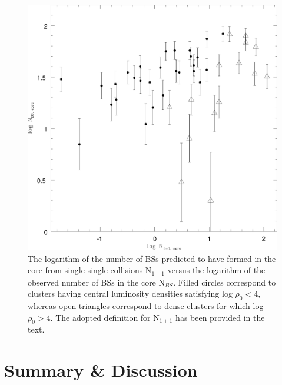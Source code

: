 \begin{figure} [!h]
  \begin{center}
 \includegraphics[scale=0.5]{Chapter-4/fig5.eps}
\caption[Plot showing the logarithm of the number of BSs predicted to
have formed in the core from single-single collisions versus the logarithm of
the observed number of BSs in the core.]{The logarithm of the number
  of BSs predicted to have formed in the core from single-single collisions
  N$_{1+1}$ 
  versus the logarithm of the observed number of BSs in the core N$_{BS}$.
  Filled circles correspond to clusters
having central luminosity densities satisfying log $\rho_0 < 4$, 
whereas open triangles correspond to dense clusters for which log
$\rho_0 > 4$.  The adopted definition for N$_{1+1}$ has been provided
in the text.
\label{fig:Ncoll_vs_Nbs}}
\end{center}
\end{figure}
  

\section{Summary \& Discussion} \label{discussion4}

